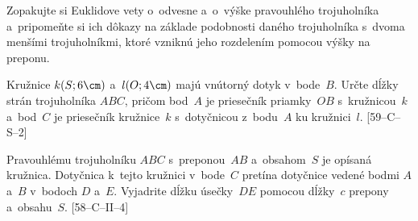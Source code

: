 {
Zopakujte si Euklidove vety o~odvesne a~o~výške pravouhlého
trojuholníka a~pripomeňte si ich dôkazy na základe podobnosti daného
trojuholníka s~dvoma menšími trojuholníkmi, ktoré vzniknú jeho rozdelením
pomocou výšky na preponu.

\D
Kružnice $k(S;6\cm)$ a~$l(O;4\cm)$ majú vnútorný dotyk v~bode~$B$.
Určte dĺžky strán trojuholníka $ABC$, pričom bod~$A$ je priesečník priamky~$OB$
s~kružnicou~$k$ a~bod~$C$ je priesečník kružnice~$k$ s~dotyčnicou z~bodu~$A$
ku kružnici~$l$. [59--C--S--2]

Pravouhlému trojuholníku $ABC$ s~preponou~$AB$ a~obsahom~$S$ je opísaná kružnica. Dotyčnica k~tejto kružnici v~bode~$C$ pretína dotyčnice vedené bodmi $A$ a~$B$ v~bodoch $D$ a~$E$. Vyjadrite dĺžku úsečky~$DE$ pomocou dĺžky~$c$ prepony a~obsahu~$S$. [58--C--II--4]
}

